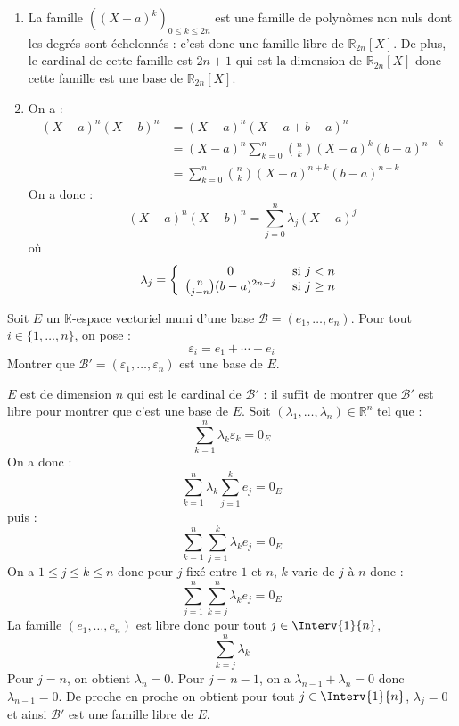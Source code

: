 \documentclass[a4paper,twoside,french,11pt]{VcCours}
\begin{document}
\corr 

\begin{enumerate}
\item La famille $((X-a)^k)_{0 \leq k \leq 2n}$ est une famille de polynômes non nuls dont les degrés sont échelonnés : c'est donc une famille libre de $\mathbb{R}_{2n}[X]$. De plus, le cardinal de cette famille est $2n+1$ qui est la dimension de $\mathbb{R}_{2n}[X]$ donc cette famille est une base de $\mathbb{R}_{2n}[X]$.
\item On a :
\begin{align*}
(X-a)^n(X-b)^n & = (X-a)^n (X-a + b-a)^n \\
& = (X-a)^n \sum_{k=0}^n \binom{n}{k} (X-a)^k (b-a)^{n-k} \\
& = \sum_{k=0}^n \binom{n}{k} (X-a)^{n+k} (b-a)^{n-k} 
\end{align*}
On a donc :
$$ (X-a)^n(X-b)^n = \sum_{j=0}^n \lambda_j (X-a)^j$$
où 
$$ \lambda_j = \left\lbrace \begin{array}{ccl}
0 & \hbox{ si } j <n\\
\binom{n}{j-n} (b-a)^{2n-j} & \hbox{ si } j \geq n \\
\end{array}\right.$$
\end{enumerate}

\begin{Exercice}{} Soit $E$ un $\mathbb{K}$-espace vectoriel muni d'une base $\mathcal{B} = (e_1 , \ldots ,e_n)$. Pour tout $i \in \lbrace 1, \ldots ,n \rbrace$, on pose :
$$\varepsilon_i = e_1 + \cdots + e_i$$
Montrer que $\mathcal{B}' = (\varepsilon_1 , \ldots ,\varepsilon_n)$ est une base de $E$.
\end{Exercice} 

\corr $E$ est de dimension $n$ qui est le cardinal de $\mathcal{B}'$ : il suffit de montrer que $\mathcal{B}'$ est libre pour montrer que c'est une base de $E$. Soit $(\lambda_1, \ldots, \lambda_n) \in \mathbb{R}^n$ tel que :
$$ \sum_{k=1}^n \lambda_k \varepsilon_k = 0_E$$
On a donc :
$$ \sum_{k=1}^n \lambda_k  \sum_{j=1}^k e_j = 0_E$$
puis : 
$$ \sum_{k=1}^n   \sum_{j=1}^k \lambda_k e_j = 0_E$$
On a $1 \leq j \leq k \leq n$ donc pour $j$ fixé entre $1$ et $n$, $k$ varie de $j$ à $n$ donc :
$$ \sum_{j=1}^n   \sum_{k=j}^n \lambda_k e_j = 0_E$$
La famille $(e_1, \ldots, e_n)$ est libre donc pour tout $j \in \Interv{1}{n}$,
$$ \sum_{k=j}^n \lambda_k$$
Pour $j=n$, on obtient $\lambda_n=0$. Pour $j=n-1$, on a $\lambda_{n-1}+\lambda_n=0$ donc $\lambda_{n-1}=0$. De proche en proche on obtient pour tout $j \in \Interv{1}{n}$, $\lambda_j=0$ et ainsi $\mathcal{B}'$ est une famille libre de $E$.
\end{document}
